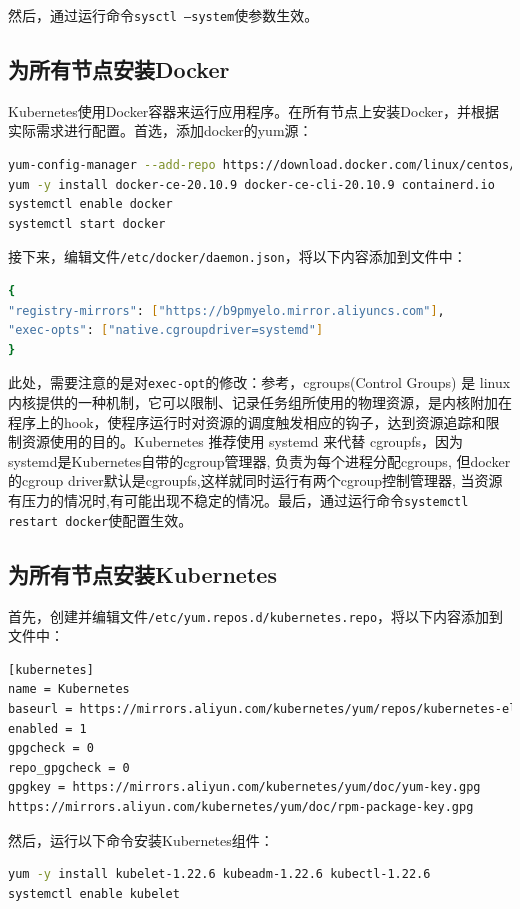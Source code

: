 然后，通过运行命令\texttt{sysctl --system}使参数生效。

\subsection{为所有节点安装Docker}
Kubernetes使用Docker容器来运行应用程序。在所有节点上安装Docker，并根据实际需求进行配置。首选，添加docker的yum源：

\begin{lstlisting}[language=bash]
yum-config-manager --add-repo https://download.docker.com/linux/centos/docker-ce.repo
yum -y install docker-ce-20.10.9 docker-ce-cli-20.10.9 containerd.io
systemctl enable docker
systemctl start docker
\end{lstlisting}
接下来，编辑文件\texttt{/etc/docker/daemon.json}，将以下内容添加到文件中：
\begin{lstlisting}[language=bash]
{
"registry-mirrors": ["https://b9pmyelo.mirror.aliyuncs.com"],
"exec-opts": ["native.cgroupdriver=systemd"]
}
\end{lstlisting}

此处，需要注意的是对\texttt{exec-opt}的修改：参考\citep{systemd}，cgroups(Control Groups) 是 linux 内核提供的一种机制，它可以限制、记录任务组所使用的物理资源，是内核附加在程序上的hook，使程序运行时对资源的调度触发相应的钩子，达到资源追踪和限制资源使用的目的。Kubernetes 推荐使用 systemd 来代替 cgroupfs，因为systemd是Kubernetes自带的cgroup管理器, 负责为每个进程分配cgroups, 但docker的cgroup driver默认是cgroupfs,这样就同时运行有两个cgroup控制管理器, 当资源有压力的情况时,有可能出现不稳定的情况。最后，通过运行命令\texttt{systemctl restart docker}使配置生效。


\subsection{为所有节点安装Kubernetes}
首先，创建并编辑文件\texttt{/etc/yum.repos.d/kubernetes.repo}，将以下内容添加到文件中：
\begin{lstlisting}[language=bash]
[kubernetes]
name = Kubernetes
baseurl = https://mirrors.aliyun.com/kubernetes/yum/repos/kubernetes-el7-x86_64
enabled = 1
gpgcheck = 0
repo_gpgcheck = 0
gpgkey = https://mirrors.aliyun.com/kubernetes/yum/doc/yum-key.gpg
https://mirrors.aliyun.com/kubernetes/yum/doc/rpm-package-key.gpg
\end{lstlisting}

然后，运行以下命令安装Kubernetes组件：
\begin{lstlisting}[language=bash]
yum -y install kubelet-1.22.6 kubeadm-1.22.6 kubectl-1.22.6
systemctl enable kubelet
\end{lstlisting}

